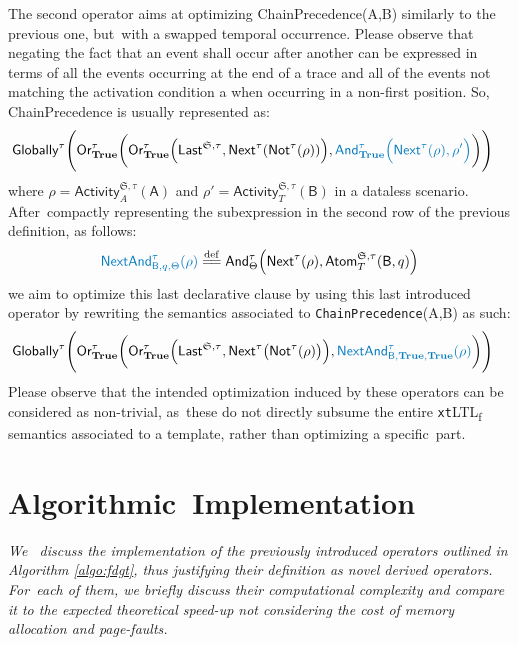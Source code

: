 \documentclass[information,article,accept,pdftex,oneauthor]{Definitions/mdpi}
\newcommand{\eqdef}{\overset{\mathrm{def}}{=\joinrel=}}
\newcommand{\LOG}{\ensuremath{\mathfrak{S}}}
\begin{document}
The second operator aims at optimizing \textsf{ChainPrecedence(A,B)} similarly to the previous one, but~with a swapped temporal occurrence. Please observe that negating the fact that an event shall occur after another can be expressed in terms of all the events occurring at the end of a trace and all of the events not matching the activation condition a when occurring in a non-first position. So, ChainPrecedence is usually represented as:
\[\begin{split}
\textsf{Globally}^\tau\Bigg(\textsf{Or}^\tau_\textbf{True}\bigg(&\textsf{Or}^\tau_\textbf{True}\Big(\textsf{Last}^{\LOG,\tau},\textsf{Next}^\tau(\textsf{Not}^\tau(\rho))\Big), {\color{oceanboatblue}\textsf{And}^\tau_\textbf{True}\Big(\textsf{Next}^\tau(\rho),\rho'\Big)}\bigg)\Bigg)
\end{split}\]
where $\rho=\textsf{Activity}^{\LOG,\tau}_A(\textsf{A})$ and $\rho'=\textsf{Activity}^{\LOG,\tau}_T(\textsf{B})$ in a dataless scenario. After~compactly representing the subexpression in the second row of the previous definition, as follows:
\begin{equation}\label{lastEQ}
{\color{oceanboatblue}\textsf{NextAnd}^\tau_{\textsf{B},q,\Theta}(\rho)}\eqdef\textsf{And}^\tau_\Theta\left(\textsf{Next}^\tau(\rho),\textsf{Atom}^{\LOG,\tau}_{T}(\textsf{B},q)\right)
\end{equation}
 we %
aim to optimize this last declarative clause by using this last introduced operator by rewriting the semantics associated to \texttt{Chain\-Precedence}(\textsf{A},\textsf{B}) as such:
\begin{equation}\label{qp4}
    \begin{split}
\textsf{Globally}^\tau\Bigg(\textsf{Or}^\tau_\textbf{True}\bigg(&\textsf{Or}^\tau_\textbf{True}\Big(\textsf{Last}^{\LOG,\tau},\textsf{Next}^\tau\big(\textsf{Not}^\tau(\rho)\big)\Big),{\color{oceanboatblue}\textsf{NextAnd}^\tau_{\textsf{B},\textbf{True},\textbf{True}}(\rho)}\bigg)\Bigg)
\end{split}
\end{equation}
Please observe that the intended optimization induced by these operators can be considered as non-trivial, as~these do not directly subsume the entire \texttt{xt}LTL\textsubscript{f} semantics associated to a template, rather than optimizing a specific~part.


\section{Algorithmic~Implementation}\label{sec:algos}
\textit{{We}%
~discuss the implementation of the previously introduced operators outlined in Algorithm \ref{algo:fdgt}, thus justifying their definition as novel derived operators. For~each of them, we briefly discuss their computational complexity and compare it to the expected theoretical speed-up not considering the cost of memory allocation and page-faults.}\medskip
\end{document}
